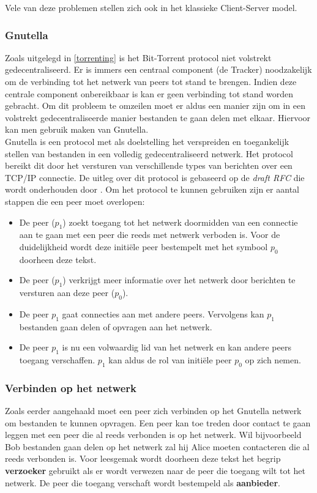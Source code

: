 Vele van deze problemen stellen zich ook in het klassieke Client-Server model.

\subsubsection{Gnutella}
\label{Gnutella}
Zoals uitgelegd in \ref{torrenting} is het Bit-Torrent protocol niet volstrekt gedecentraliseerd. Er is immers een centraal component (de Tracker) noodzakelijk om de verbinding tot het netwerk van peers tot stand te brengen. Indien deze centrale component onbereikbaar is kan er geen verbinding tot stand worden gebracht. Om dit probleem te omzeilen moet er aldus een manier zijn om in een volstrekt gedecentraliseerde manier bestanden te gaan delen met elkaar. Hiervoor kan men gebruik maken van Gnutella.\\

Gnutella is een protocol met als doelstelling het verspreiden en toegankelijk stellen van bestanden in een volledig gedecentraliseerd netwerk. Het protocol bereikt dit door het versturen van verschillende types van berichten over een TCP/IP connectie. De uitleg over dit protocol is gebaseerd op de \textit{draft RFC} die wordt onderhouden door \textcite{Klingberg2002}. Om het protocol te kunnen gebruiken zijn er aantal stappen die een peer moet overlopen:

\begin{itemize}
\item De peer ($p_1$) zoekt toegang tot het netwerk doormidden van een connectie aan te gaan met een peer die reeds met netwerk verboden is. Voor de duidelijkheid wordt deze initiële peer bestempelt met het symbool $p_0$ doorheen deze tekst.\\
\item De peer ($p_1$) verkrijgt meer informatie over het netwerk door berichten te versturen aan deze peer ($p_0$).\\
\item De peer $p_1$ gaat connecties aan met andere peers. Vervolgens kan $p_1$ bestanden gaan delen of opvragen aan het netwerk.\\
\item De peer $p_1$ is nu een volwaardig lid van het netwerk en kan andere peers toegang verschaffen. $p_1$ kan aldus de rol van initiële peer $p_0$ op zich nemen.
\end{itemize}

\subsubsection{Verbinden op het netwerk}
Zoals eerder aangehaald moet een peer zich verbinden op het Gnutella netwerk om bestanden te kunnen opvragen. Een peer kan toe treden door contact te gaan leggen met een peer die al reeds verbonden is op het netwerk. Wil bijvoorbeeld Bob bestanden gaan delen op het netwerk zal hij Alice moeten contacteren die al reeds verbonden is. Voor leesgemak wordt doorheen deze tekst het begrip \textbf{verzoeker} gebruikt als er wordt verwezen naar de peer die toegang wilt tot het netwerk. De peer die toegang verschaft wordt bestempeld als \textbf{aanbieder}.\\


